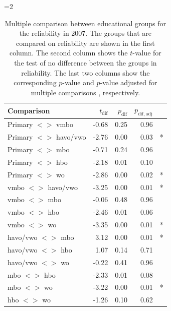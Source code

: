 \documentclass[a4paper,11pt]{article}
\newcommand{\0}{\boldsymbol{0}}
\begin{document}
=2
\begin{table}[ht]
\begin{center}
\begin{tabular}{lrrrl}
  \hline  \hline
 Comparison & $t_{\mathrm{dif}}$ & $p_{\mathrm{dif}}$ & $p_{\mathrm{dif,adj}}$ &  \\ 
  \hline
Primary $<$$>$ vmbo & -0.68 & 0.25 & 0.96 &  \\ 
Primary $<$$>$ havo/vwo & -2.76 & 0.00 & 0.03 & * \\ 
Primary $<$$>$ mbo & -0.71 & 0.24 & 0.96 &  \\ 
Primary $<$$>$ hbo & -2.18 & 0.01 & 0.10 &  \\ 
Primary $<$$>$ wo & -2.86 & 0.00 & 0.02 & * \\ 
vmbo $<$$>$ havo/vwo & -3.25 & 0.00 & 0.01 & * \\ 
vmbo $<$$>$ mbo & -0.06 & 0.48 & 0.96 &  \\ 
vmbo $<$$>$ hbo & -2.46 & 0.01 & 0.06 &  \\ 
vmbo $<$$>$ wo & -3.35 & 0.00 & 0.01 & * \\ 
 havo/vwo $<$$>$ mbo & 3.12 & 0.00 & 0.01 & * \\ 
 havo/vwo $<$$>$ hbo & 1.07 & 0.14 & 0.71 &  \\ 
 havo/vwo $<$$>$ wo & -0.22 & 0.41 & 0.96 &  \\ 
 mbo $<$$>$ hbo & -2.33 & 0.01 & 0.08 &  \\ 
 mbo $<$$>$ wo & -3.22 & 0.00 & 0.01 & * \\ 
 hbo $<$$>$ wo & -1.26 & 0.10 & 0.62 &  \\ 
   \hline  \hline
\end{tabular}\caption{Multiple comparison between educational groups for the reliability in 2007. 
	The groups that are compared on reliability are shown in the first column. The second column shows the
	$t$-value for the test of no difference between the groups in reliability. The last two columns show 
	the corresponding $p$-value and $p$-value adjusted for multiple comparisons \citep{holm1979simple}, respectively.}\label{tab:tests}
\end{center}
\end{table}
\fi
\end{document}
